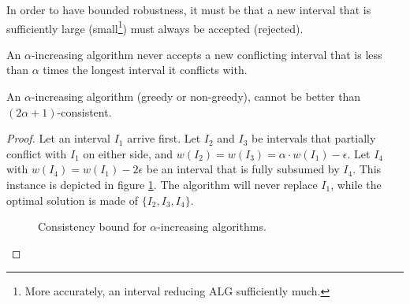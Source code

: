 \begin{observation}
    In order to have bounded robustness, it must be that a new interval that is sufficiently large (small\footnote{More accurately, an interval reducing ALG sufficiently much. }) must always be accepted (rejected).
\end{observation}

\begin{definition}
    An $\alpha$-increasing algorithm never accepts a new conflicting interval
that is less than $\alpha$ times the longest interval it conflicts with.
\end{definition}
\begin{lemma}
    An $\alpha$-increasing algorithm (greedy or non-greedy), cannot be better than $(2\alpha +1)$-consistent.
\end{lemma}
\begin{proof}
    Let an interval $I_1$ arrive first. Let $I_2$ and $I_3$ be intervals that partially conflict with $I_1$ on either side, and $w(I_2) = w(I_3) = \alpha \cdot w(I_1) - \epsilon$. Let $I_4$ with $w(I_4) = w(I_1)-2\epsilon$ be an interval that is fully subsumed by $I_4$. This instance is depicted in figure \ref{fig:neg-alpha-increasing}. The algorithm will never replace $I_1$, while the optimal solution is made of $\{I_2,I_3,I_4\}$.
    \begin{figure}[h] %
        \centering
        \caption{Consistency bound for $\alpha$-increasing algorithms.}
        \label{fig:neg-alpha-increasing}
    \end{figure}
\end{proof}
